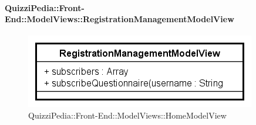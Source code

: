 \paragraph{QuizziPedia::Front-End::ModelViews::RegistrationManagementModelView}
	
	\label{QuizziPedia::Front-End::ModelViews::RegistrationManagementModelView}
	
	\begin{figure}[ht]
		\centering
		\includegraphics[scale=0.5,keepaspectratio]{UML/Classi/Front-End/QuizziPedia_Front-end_ModelView_RegistrationManagementModelView.png}
		\caption{QuizziPedia::Front-End::ModelViews::HomeModelView}
	\end{figure} \FloatBarrier
	
